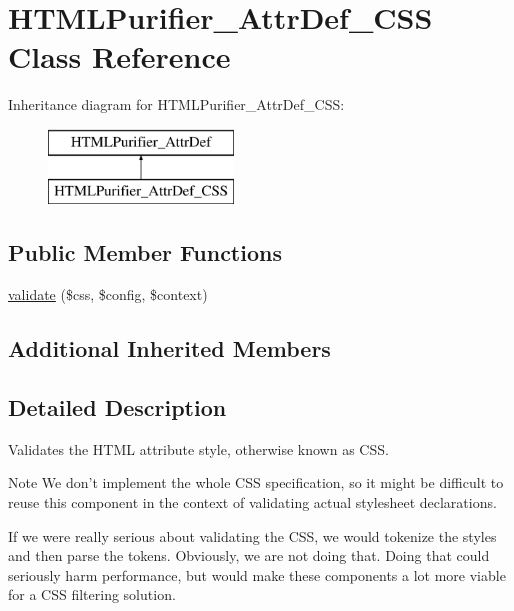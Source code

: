 \hypertarget{classHTMLPurifier__AttrDef__CSS}{\section{H\+T\+M\+L\+Purifier\+\_\+\+Attr\+Def\+\_\+\+C\+S\+S Class Reference}
\label{classHTMLPurifier__AttrDef__CSS}
}
Inheritance diagram for H\+T\+M\+L\+Purifier\+\_\+\+Attr\+Def\+\_\+\+C\+S\+S\+:\begin{figure}[H]
\begin{center}
\leavevmode
\includegraphics[height=2.000000cm]{classHTMLPurifier__AttrDef__CSS}
\end{center}
\end{figure}
\subsection*{Public Member Functions}
\begin{DoxyCompactItemize}
\item 
\hyperlink{classHTMLPurifier__AttrDef__CSS_ace0c1bcf604a2fd44b62b0564ec1a6de}{validate} (\$css, \$config, \$context)
\end{DoxyCompactItemize}
\subsection*{Additional Inherited Members}


\subsection{Detailed Description}
Validates the H\+T\+M\+L attribute style, otherwise known as C\+S\+S. \begin{DoxyNote}{Note}
We don't implement the whole C\+S\+S specification, so it might be difficult to reuse this component in the context of validating actual stylesheet declarations. 

If we were really serious about validating the C\+S\+S, we would tokenize the styles and then parse the tokens. Obviously, we are not doing that. Doing that could seriously harm performance, but would make these components a lot more viable for a C\+S\+S filtering solution. 
\end{DoxyNote}


